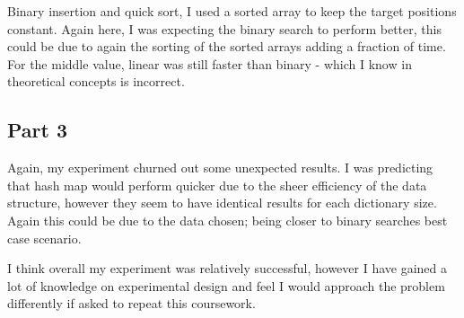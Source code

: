 \documentclass{article}
\begin{document}
Binary insertion and quick sort, I used a sorted array to keep the target positions constant. Again here, I was expecting the binary search to perform better, this could be due to again the sorting of the sorted arrays adding a fraction of time. For the middle value, linear was still faster than binary - which I know in theoretical concepts is incorrect.\par


\subsection{Part 3}

Again, my experiment churned out some unexpected results. I was predicting that hash map would perform quicker due to the sheer efficiency of the data structure, however they seem to have identical results for each dictionary size. Again this could be due to the data chosen; being closer to binary searches best case scenario.\par

I think overall my experiment was relatively successful, however I have gained a lot of knowledge on experimental design and feel I would approach the problem differently if asked to repeat this coursework.\par
\end{document}
